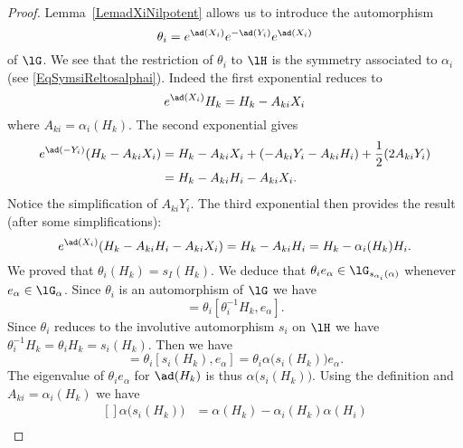 \begin{proof}
    Lemma~\ref{LemadXiNilpotent} allows us to introduce the automorphism
    \begin{equation}
        \theta_i= e^{\ad(X_i)} e^{-\ad(Y_i)} e^{\ad(X_i)}
    \end{equation}
    of \( \lG\). We see that the restriction of \( \theta_i\) to \( \lH\) is the symmetry associated to \( \alpha_i\) (see \eqref{EqSymsiReltosalphai}). Indeed the first exponential reduces to
    \begin{equation}
        e^{\ad(X_i)}H_k=H_k-A_{ki}X_i
    \end{equation}
    where \( A_{ki}=\alpha_i(H_k)\). The second exponential gives
    \begin{equation}
        \begin{aligned}[]
            e^{\ad(-Y_i)}(H_k-A_{ki}X_i)&=H_k-A_{ki}X_i+(-A_{ki}Y_i-A_{ki}H_i)+\frac{ 1 }{2}(2A_{ki}Y_i)\\
            &=H_k-A_{ki}H_i-A_{ki}X_i.
        \end{aligned}
    \end{equation}
    Notice the simplification of \( A_{ki}Y_i\). The third exponential then provides the result (after some simplifications):
    \begin{equation}
        e^{\ad(X_i)}(H_k-A_{ki}H_i-A_{ki}X_i)=H_k-A_{ki}H_i=H_k-\alpha_i(H_k)H_i.
    \end{equation}
    We proved that \( \theta_i(H_k)=s_I(H_k)\).  We deduce that \( \theta_ie_{\alpha}\in\lG_{s_{\alpha_i}(\alpha)}\) whenever \( e_{\alpha}\in\lG_{\alpha}\). Since \( \theta_i\) is an automorphism of \( \lG\) we have
    \begin{equation}
        [H_k,\theta_ie_{\alpha}]=\theta_i[\theta_i^{-1}H_k,e_{\alpha}].
    \end{equation}
    Since \( \theta_i\) reduces to the involutive automorphism \( s_i\) on \( \lH\) we have \( \theta_i^{-1}H_k=\theta_iH_k=s_i(H_k)\). Then we have
    \begin{equation}
        [H_k,\theta_ie_{\alpha}]=\theta_i[s_i(H_k),e_{\alpha}]=\theta_i\alpha\big( s_i(H_k) \big)e_{\alpha}.
    \end{equation}
    The eigenvalue of \( \theta_ie_{\alpha}\) for \( \ad(H_k)\) is thus \( \alpha\big( s_i(H_k) \big)\). Using the definition and \( A_{ki}=\alpha_i(H_k)\) we have
    \begin{equation}
        \begin{aligned}[]
            \alpha\big( s_i(H_k) \big)&=\alpha(H_k)-\alpha_i(H_k)\alpha(H_i)\\

\end{aligned}
\end{equation}
\end{proof}
